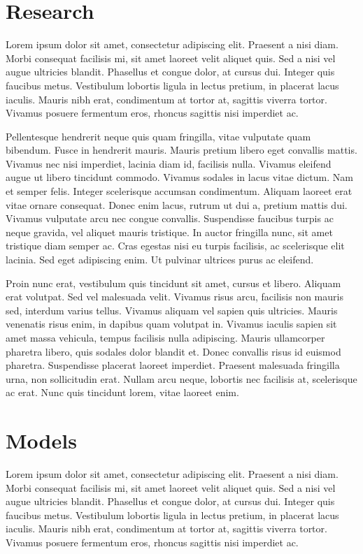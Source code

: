 \documentclass[titlepage,a4paper,12pt,thmsb]{report}
\begin{document}
\chapter{Research}

Lorem ipsum dolor sit amet, consectetur adipiscing elit. Praesent a nisi diam. Morbi consequat facilisis mi, sit amet laoreet velit aliquet quis. Sed a nisi vel augue ultricies blandit. Phasellus et congue dolor, at cursus dui. Integer quis faucibus metus. Vestibulum lobortis ligula in lectus pretium, in placerat lacus iaculis. Mauris nibh erat, condimentum at tortor at, sagittis viverra tortor. Vivamus posuere fermentum eros, rhoncus sagittis nisi imperdiet ac.

Pellentesque hendrerit neque quis quam fringilla, vitae vulputate quam bibendum. Fusce in hendrerit mauris. Mauris pretium libero eget convallis mattis. Vivamus nec nisi imperdiet, lacinia diam id, facilisis nulla. Vivamus eleifend augue ut libero tincidunt commodo. Vivamus sodales in lacus vitae dictum. Nam et semper felis. Integer scelerisque accumsan condimentum. Aliquam laoreet erat vitae ornare consequat. Donec enim lacus, rutrum ut dui a, pretium mattis dui. Vivamus vulputate arcu nec congue convallis. Suspendisse faucibus turpis ac neque gravida, vel aliquet mauris tristique. In auctor fringilla nunc, sit amet tristique diam semper ac. Cras egestas nisi eu turpis facilisis, ac scelerisque elit lacinia. Sed eget adipiscing enim. Ut pulvinar ultrices purus ac eleifend.

Proin nunc erat, vestibulum quis tincidunt sit amet, cursus et libero. Aliquam erat volutpat. Sed vel malesuada velit. Vivamus risus arcu, facilisis non mauris sed, interdum varius tellus. Vivamus aliquam vel sapien quis ultricies. Mauris venenatis risus enim, in dapibus quam volutpat in. Vivamus iaculis sapien sit amet massa vehicula, tempus facilisis nulla adipiscing. Mauris ullamcorper pharetra libero, quis sodales dolor blandit et. Donec convallis risus id euismod pharetra. Suspendisse placerat laoreet imperdiet. Praesent malesuada fringilla urna, non sollicitudin erat. Nullam arcu neque, lobortis nec facilisis at, scelerisque ac erat. Nunc quis tincidunt lorem, vitae laoreet enim.


\chapter{Models}

Lorem ipsum dolor sit amet, consectetur adipiscing elit. Praesent a nisi diam. Morbi consequat facilisis mi, sit amet laoreet velit aliquet quis. Sed a nisi vel augue ultricies blandit. Phasellus et congue dolor, at cursus dui. Integer quis faucibus metus. Vestibulum lobortis ligula in lectus pretium, in placerat lacus iaculis. Mauris nibh erat, condimentum at tortor at, sagittis viverra tortor. Vivamus posuere fermentum eros, rhoncus sagittis nisi imperdiet ac.
\end{document}
